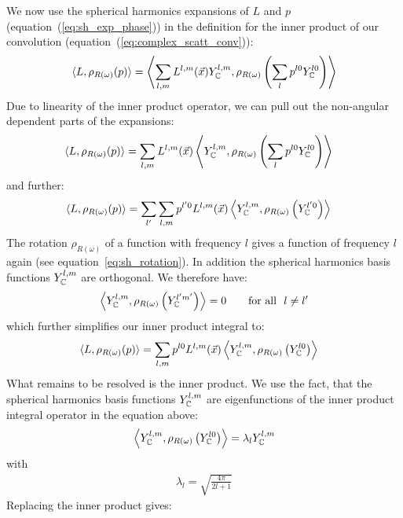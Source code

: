We now use the spherical harmonics expansions of $L$ and $p$ (equation~(\ref{eq:sh_exp_phase})) in the definition for the inner product of our convolution (equation~(\ref{eq:complex_scatt_conv})):
\begin{align*}
\langle L,  \rho_{R(\omega)}(p)\rangle = \left < \sum_{l,m}{L^{l,m}(\vec{x}) Y_{\mathbb{C}}^{l,m}}, \rho_{R(\omega)}\left ( \sum_{l}{p^{l0}Y_{\mathbb{C}}^{l0}} \right )\right>
\end{align*}
Due to linearity of the inner product operator, we can pull out the non-angular dependent parts of the expansions:
\begin{align*}
\langle L,  \rho_{R(\omega)}(p)\rangle
&=
\sum_{l,m}
{
L^{l,m}(\vec{x})
\left<
Y_{\mathbb{C}}^{l,m},
\rho_{R(\omega)}
\left(\sum_l{p^{l0} Y_{\mathbb{C}}^{l0}}\right)
\right>
}
\end{align*}
and further:
\begin{align*}
\langle L,  \rho_{R(\omega)}(p)\rangle
&=
\sum_{l'}
{
\sum_{l,m}
{
p^{l'0}L^{l,m}(\vec{x})
\left<Y_{\mathbb{C}}^{l,m}, \rho_{R(\omega)}\left( Y_{\mathbb{C}}^{l'0} \right)\right>
}
}
\end{align*}
The rotation $\rho_{R(\omega)}$ of a function with frequency $l$ gives a function of frequency $l$ again (see equation~\ref{eq:sh_rotation}). In addition the spherical harmonics basis functions $Y_{\mathbb{C}}^{l,m}$ are orthogonal. We therefore have:
\begin{align*}
\left<
Y_{\mathbb{C}}^{l,m}, \rho_{R(\omega)}\left(Y_{\mathbb{C}}^{l'm'}\right)
\right> = 0       \qquad    \text{for all}\ \ l\ne l' 
\end{align*}
which further simplifies our inner product integral to:
\begin{align*}
\langle L,  \rho_{R(\omega)}(p)\rangle
&=
\sum_{l,m}
{
p^{l0}L^{l,m}(\vec{x})
\left<
Y_{\mathbb{C}}^{l,m}, \rho_{R(\omega)}\left(Y_{\mathbb{C}}^{l0} \right )
\right>
}
\end{align*}
What remains to be resolved is the inner product. We use the fact, that the spherical harmonics basis functions $ Y_{\mathbb{C}}^{l,m}$ are eigenfunctions of the inner product integral operator in the equation above:
\begin{align*}
\left<
Y_{\mathbb{C}}^{l,m}, \rho_{R(\omega)}\left ( Y_{\mathbb{C}}^{l0} \right )\right> = \lambda_l Y_{\mathbb{C}}^{l,m}
\end{align*}
with
\begin{align*}
\lambda_l=\sqrt{\frac{4\pi}{2l+1}}
\end{align*}
Replacing the inner product gives:

